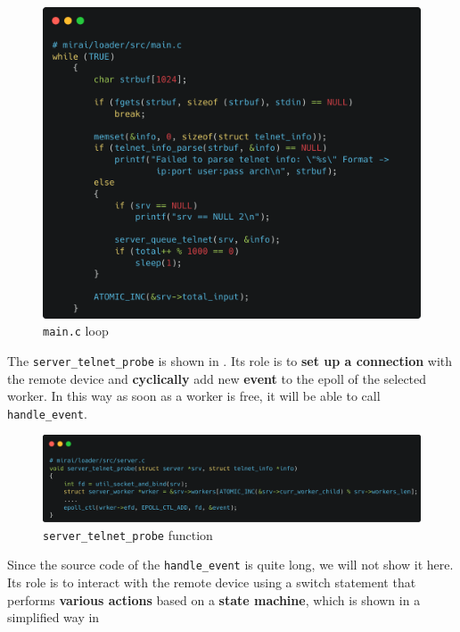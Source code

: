 \begin{figure}[ht]
    \centering
    \includegraphics[scale=0.15]{resources/images/main.png}
    \caption{\texttt{main.c} loop}
    \label{fig:mainloop}
\end{figure}

The \texttt{server\_telnet\_probe} is shown in . Its role is to \textbf{set up a connection} with the remote device and \textbf{cyclically} add new \textbf{event} to the epoll of the selected worker. In this way as soon as a worker is free, it will be able to call \texttt{handle\_event}.

\begin{figure}[ht]
    \centering
    \includegraphics[scale=0.15]{resources/images/sever_telnet_probe.png}
    \caption{\texttt{server\_telnet\_probe} function}
    \label{fig:server-telnet-probe}
\end{figure}

Since the source code of the \texttt{handle\_event} is quite long, we will not show it here. Its role is to interact with the remote device using a switch statement that performs \textbf{various actions} based on a \textbf{state machine}, which is shown in a simplified way in 

